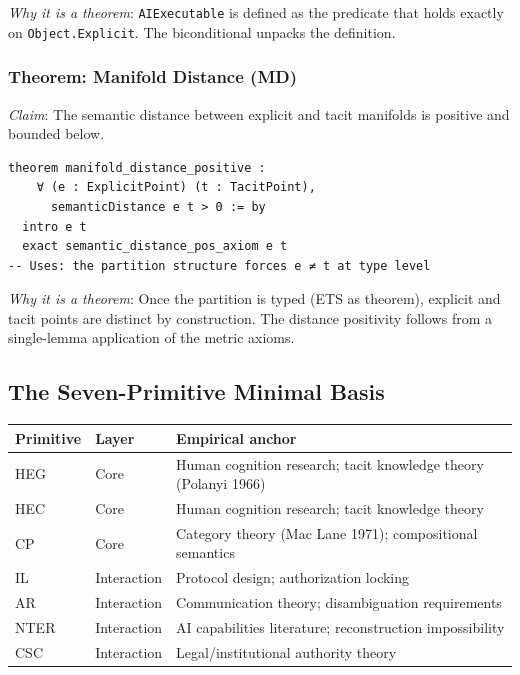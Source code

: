 \textit{Why it is a theorem}: \texttt{AIExecutable} is defined as the predicate
that holds exactly on \texttt{Object.Explicit}. The biconditional unpacks the
definition.

\subsubsection{Theorem: Manifold Distance (MD)}

\textit{Claim}: The semantic distance between explicit and tacit manifolds is
positive and bounded below.

\begin{lstlisting}
theorem manifold_distance_positive :
    ∀ (e : ExplicitPoint) (t : TacitPoint),
      semanticDistance e t > 0 := by
  intro e t
  exact semantic_distance_pos_axiom e t
-- Uses: the partition structure forces e ≠ t at type level
\end{lstlisting}

\textit{Why it is a theorem}: Once the partition is typed (ETS as theorem),
explicit and tacit points are distinct by construction. The distance positivity
follows from a single-lemma application of the metric axioms.

\subsection{The Seven-Primitive Minimal Basis}

\begin{center}
\begin{tabular}{lll}
\toprule
Primitive & Layer & Empirical anchor \\
\midrule
HEG & Core & Human cognition research; tacit knowledge theory (Polanyi 1966) \\
HEC & Core & Human cognition research; tacit knowledge theory \\
CP & Core & Category theory (Mac Lane 1971); compositional semantics \\
IL & Interaction & Protocol design; authorization locking \\
AR & Interaction & Communication theory; disambiguation requirements \\
NTER & Interaction & AI capabilities literature; reconstruction impossibility \\
CSC & Interaction & Legal/institutional authority theory \\
\bottomrule
\end{tabular}
\end{center}

